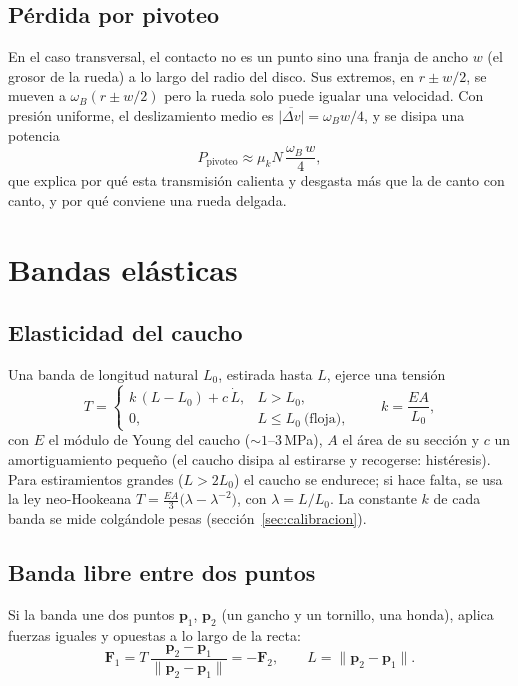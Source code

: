 \documentclass[11pt,a4paper]{article}
\numberwithin{equation}{section}
\newcommand{\vect}[1]{\bm{#1}}
\begin{document}
\subsection{Pérdida por pivoteo}
En el caso transversal, el contacto no es un punto sino una franja de ancho $w$ (el grosor de la rueda) a lo largo
del radio del disco. Sus extremos, en $r\pm w/2$, se mueven a $\omega_B(r\pm w/2)$ pero la rueda solo puede igualar
una velocidad. Con presión uniforme, el deslizamiento medio es $\overline{\lvert\Delta v\rvert} = \omega_B w/4$, y se
disipa una potencia
\begin{equation}
  P_{\text{pivoteo}} \approx \mu_k N\,\frac{\omega_B\, w}{4},
\end{equation}
que explica por qué esta transmisión calienta y desgasta más que la de canto con canto, y por qué conviene una rueda
delgada.

\section{Bandas elásticas}

\subsection{Elasticidad del caucho}
Una banda de longitud natural $L_0$, estirada hasta $L$, ejerce una tensión
\begin{equation}
  T = \begin{cases} k\,(L - L_0) + c\,\dot L, & L > L_0,\\ 0, & L \le L_0 \ \text{(floja)},\end{cases}
  \qquad k = \frac{E A}{L_0},
\end{equation}
con $E$ el módulo de Young del caucho ($\sim 1$--$3$\,MPa), $A$ el área de su sección y $c$ un amortiguamiento
pequeño (el caucho disipa al estirarse y recogerse: histéresis). Para estiramientos grandes ($L > 2L_0$) el caucho
se endurece; si hace falta, se usa la ley neo-Hookeana $T = \tfrac{EA}{3}\bigl(\lambda - \lambda^{-2}\bigr)$, con
$\lambda = L/L_0$. La constante $k$ de cada banda se mide colgándole pesas (sección~\ref{sec:calibracion}).

\subsection{Banda libre entre dos puntos}
Si la banda une dos puntos $\vect{p}_1$, $\vect{p}_2$ (un gancho y un tornillo, una honda), aplica fuerzas iguales y
opuestas a lo largo de la recta:
\begin{equation}
  \vect{F}_1 = T\,\frac{\vect{p}_2 - \vect{p}_1}{\lVert\vect{p}_2 - \vect{p}_1\rVert} = -\vect{F}_2,
  \qquad L = \lVert\vect{p}_2 - \vect{p}_1\rVert .
\end{equation}
\end{document}
